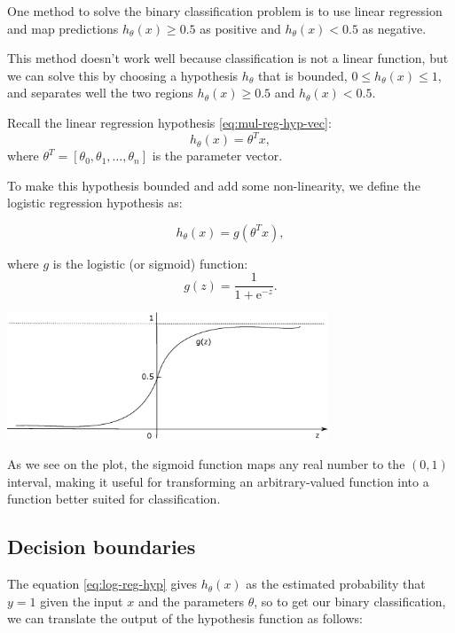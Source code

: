 \documentclass[a4paper,11pt]{report}
\begin{document}
One method to solve the binary classification problem is to use linear regression and map predictions $h_\theta(x)\geq 0.5$ as positive and $h_\theta(x) < 0.5$ as negative.

This method doesn't work well because classification is not a linear function, but we can solve this by choosing a hypothesis $h_\theta$ that is bounded, $0 \leq h_\theta (x) \leq 1$, and separates well the two regions $h_\theta(x)\geq 0.5$ and $h_\theta(x) < 0.5$.

Recall the linear regression hypothesis \eqref{eq:mul-reg-hyp-vec}: $$h_\theta(x) = \theta^Tx,$$ where $\theta^T = [\theta_0, \theta_1, \ldots, \theta_n]$ is the parameter vector.

To make this hypothesis bounded and add some non-linearity, we define the logistic regression hypothesis as:

\begin{equation}\label{eq:log-reg-hyp}
h_\theta(x) = g(\theta^Tx),
\end{equation}

where $g$ is the logistic (or sigmoid) function: $$g(z) = \dfrac{1}{1+\mathrm{e}^{-z}}.$$

\begin{center}
\includegraphics[height = 1.5in]{Images/sigmoid}
\end{center}

As we see on the plot, the sigmoid function maps any real number to the $(0, 1)$ interval, making it useful for transforming an arbitrary-valued function into a function better suited for classification.

\subsection*{Decision boundaries}

The equation \eqref{eq:log-reg-hyp} gives $h_\theta(x)$ as the estimated probability that $y=1$ given the input $x$ and the parameters $\theta$, so to get our binary classification, we can translate the output of the hypothesis function as follows:
\end{document}
